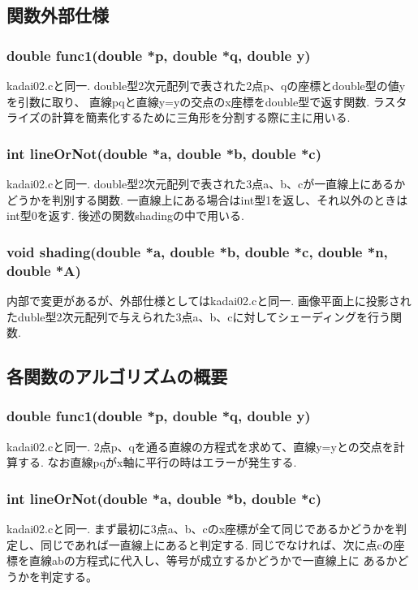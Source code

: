 \documentclass[a4j,dvipdfmx]{jsarticle}
\begin{document}

\subsection{関数外部仕様}
\subsubsection{double func1(double *p, double *q, double y)}
kadai02.cと同一.
double型2次元配列で表された2点p、qの座標とdouble型の値yを引数に取り、
直線pqと直線y=yの交点のx座標をdouble型で返す関数.
ラスタライズの計算を簡素化するために三角形を分割する際に主に用いる.

\subsubsection{int lineOrNot(double *a, double *b, double *c)}
kadai02.cと同一.
double型2次元配列で表された3点a、b、cが一直線上にあるかどうかを判別する関数.
一直線上にある場合はint型1を返し、それ以外のときはint型0を返す.
後述の関数shadingの中で用いる.

\subsubsection{void shading(double *a, double *b, double *c, double *n, double *A)}
内部で変更があるが、外部仕様としてはkadai02.cと同一.
画像平面上に投影されたduble型2次元配列で与えられた3点a、b、cに対してシェーディングを行う関数.
\subsection{各関数のアルゴリズムの概要}
\subsubsection{double func1(double *p, double *q, double y)}
kadai02.cと同一.
2点p、qを通る直線の方程式を求めて、直線y=yとの交点を計算する.
なお直線pqがx軸に平行の時はエラーが発生する.

\subsubsection{int lineOrNot(double *a, double *b, double *c)}
kadai02.cと同一.
まず最初に3点a、b、cのx座標が全て同じであるかどうかを判定し、同じであれば一直線上にあると判定する.
同じでなければ、次に点cの座標を直線abの方程式に代入し、等号が成立するかどうかで一直線上に
あるかどうかを判定する。
\end{document}

